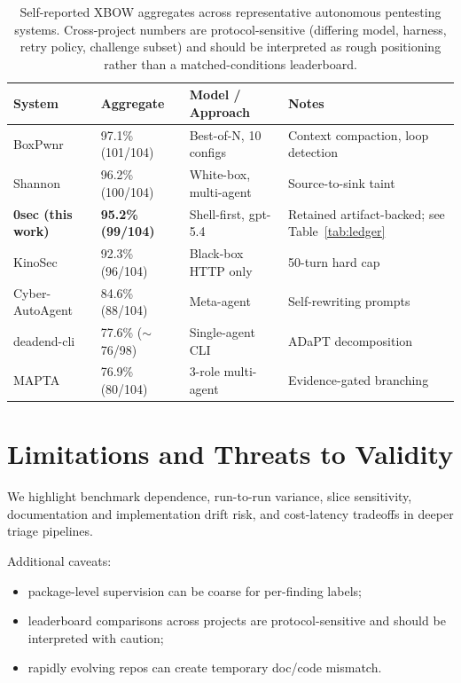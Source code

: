 \documentclass[11pt]{article}
\begin{document}
\begin{table}[ht]
\centering
\small
\begin{tabular}{llll}
\toprule
System & Aggregate & Model / Approach & Notes \\
\midrule
BoxPwnr\citep{boxpwnr}             & 97.1\% (101/104) & Best-of-N, 10 configs  & Context compaction, loop detection \\
Shannon\citep{shannon}              & 96.2\% (100/104) & White-box, multi-agent & Source-to-sink taint \\
\textbf{0sec (this work)}         & \textbf{95.2\% (99/104)} & Shell-first, gpt-5.4   & Retained artifact-backed; see Table~\ref{tab:ledger} \\
KinoSec\citep{kinosec}              & 92.3\% (96/104)  & Black-box HTTP only    & 50-turn hard cap \\
Cyber-AutoAgent\citep{cyberautoagent} & 84.6\% (88/104)  & Meta-agent             & Self-rewriting prompts \\
deadend-cli\citep{deadend}          & 77.6\% ($\sim$76/98) & Single-agent CLI     & ADaPT decomposition \\
MAPTA\citep{mapta}                  & 76.9\% (80/104)  & 3-role multi-agent     & Evidence-gated branching \\
\bottomrule
\end{tabular}
\caption{Self-reported XBOW aggregates across representative autonomous pentesting systems. Cross-project numbers are protocol-sensitive (differing model, harness, retry policy, challenge subset) and should be interpreted as rough positioning rather than a matched-conditions leaderboard.}
\label{tab:competitors}
\end{table}

\section{Limitations and Threats to Validity}

We highlight benchmark dependence, run-to-run variance, slice sensitivity,
documentation and implementation drift risk, and cost-latency tradeoffs in deeper
triage pipelines.

Additional caveats:
\begin{itemize}
  \item package-level supervision can be coarse for per-finding labels;
  \item leaderboard comparisons across projects are protocol-sensitive and
  should be interpreted with caution;
  \item rapidly evolving repos can create temporary doc/code mismatch.
\end{itemize}
\end{document}
